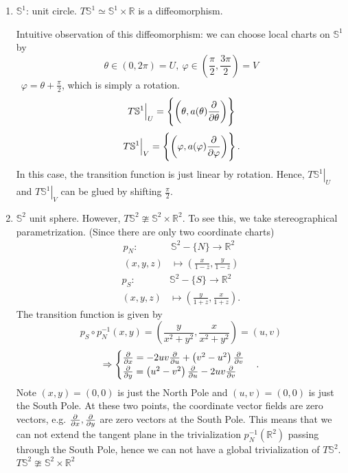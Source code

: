 \begin{exercise}
    \hfill
    \begin{enumerate}[(1)]
        \item \(\mathbb{S}^1\): unit circle. 
        \(T\mathbb{S}^1\simeq \mathbb{S}^1 \times \mathbb{R}\) 
        is a diffeomorphism.
        
        Intuitive observation of this diffeomorphism: we can
        choose local charts on \(\mathbb{S}^1\) by 
        \[\theta\in (0,2\pi)=U, ~\varphi \in 
        (\frac{\pi}{2},\frac{3\pi}{2})=V\]
        \ie\ \(\varphi=\theta+\frac{\pi}{2}\), which is simply
        a rotation. 
        \[\left.T\mathbb{S}^1\right|_U=\left\{
            \left(\theta,a(\theta)\pdv{\theta}\right)
        \right\}\]
        \[
            \left.T\mathbb{S}^1\right|_V=\left\{
            \left(\varphi,a(\varphi)\pdv{\varphi}\right)
            \right\}   
        .\]
        In this case, 
        the transition function is just linear by rotation.
        Hence, \(\left.T\mathbb{S}^1\right|_U\) and 
        \(\left.T\mathbb{S}^1\right|_V\) can be glued by shifting 
        \(\frac{\pi}{2}\).
        \item \(\mathbb{S}^2\) unit sphere.
        However, \(T\mathbb{S}^2\ncong \mathbb{S}^2\times 
        \mathbb{R}^2\).
        To see this, we take stereographical parametrization.
        (Since there are only two coordinate charts)
        \begin{align*}
            p_N\colon &\mathbb{S}^2-\{N\}\to \mathbb{R}^2\\
            (x,y,z)&\mapsto \left(\frac{x}{1-z},\frac{y}{1-z}\right)    
        \end{align*}
        \begin{align*}
            p_S\colon &\mathbb{S}^2-\{S\}\to \mathbb{R}^2\\
            (x,y,z)&\mapsto \left(\frac{y}{1+z},\frac{x}{1+z}\right)    
        .\end{align*}
        The transition function is given by 
        \[
          p_S\circ p_N^{-1}(x,y)=\left(\frac{y}{x^2+y^2},
          \frac{x}{x^2+y^2}\right)=(u,v)  
        \]
        \[
            \Rightarrow
            \begin{cases}
                \pdv{x}=-2uv\pdv{u}+\left(v^2-u^2\right)\pdv{v}\\
                \pdv y= \left(u^2-v^2\right)\pdv{u}
                -2uv\pdv{v}
            \end{cases}    
        .\]  
        Note \((x,y)=(0,0)\) is just the North Pole and 
        \((u,v)=(0,0)\) is just the South Pole. 
        At these two points, the coordinate vector fields 
        are zero vectors, e.g. \(\pdv{x},\pdv{y}\) are zero
        vectors at the South Pole.
        This means that we can not extend the tangent 
        plane in the trivialization 
        \(p_N^{-1}\left(\mathbb{R}^2\right)\)
        passing through the South Pole, hence we can not
        have a global trivialization of \(T\mathbb{S}^2\).
         \(T\mathbb{S}^2\ncong \mathbb{S}^2\times 
         \mathbb{R}^2\)
    \end{enumerate}         
\end{exercise}
